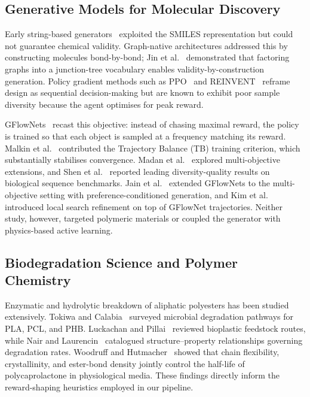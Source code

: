 \documentclass[twocolumn,10pt]{article}
\begin{document}
\subsection{Generative Models for Molecular Discovery}
Early string-based generators~\cite{segler2018generating} exploited the SMILES representation
but could not guarantee chemical validity. Graph-native architectures addressed this by
constructing molecules bond-by-bond; Jin et al.~\cite{jin2018junction} demonstrated that
factoring graphs into a junction-tree vocabulary enables validity-by-construction generation.
Policy gradient methods such as PPO~\cite{schulman2017proximal} and REINVENT~\cite{olivecrona2017molecular}
reframe design as sequential decision-making but are known to exhibit poor sample diversity
because the agent optimises for peak reward.

GFlowNets~\cite{bengio2021flow,bengio2023gflownet} recast this objective: instead of chasing
maximal reward, the policy is trained so that each object is sampled at a frequency matching
its reward. Malkin et al.~\cite{malkin2022trajectory} contributed the Trajectory Balance (TB)
training criterion, which substantially stabilises convergence. Madan et al.~\cite{madan2023learning}
explored multi-objective extensions, and Shen et al.~\cite{shen2023towards} reported leading
diversity-quality results on biological sequence benchmarks. Jain et al.~\cite{jain2023mogfn}
extended GFlowNets to the multi-objective setting with preference-conditioned generation, and
Kim et al.~\cite{kim2024lsgfn} introduced local search refinement on top of GFlowNet
trajectories. Neither study, however, targeted polymeric materials or coupled the generator
with physics-based active learning.

\subsection{Biodegradation Science and Polymer Chemistry}
Enzymatic and hydrolytic breakdown of aliphatic polyesters has been studied extensively.
Tokiwa and Calabia~\cite{tokiwa2006biodegradability} surveyed microbial degradation
pathways for PLA, PCL, and PHB. Luckachan and Pillai~\cite{luckachan2011biodegradable}
reviewed bioplastic feedstock routes, while Nair and Laurencin~\cite{nair2007biodegradable}
catalogued structure--property relationships governing degradation rates. Woodruff and
Hutmacher~\cite{woodruff2010return} showed that chain flexibility, crystallinity, and
ester-bond density jointly control the half-life of polycaprolactone in physiological
media. These findings directly inform the reward-shaping heuristics employed in our
pipeline.
\end{document}

